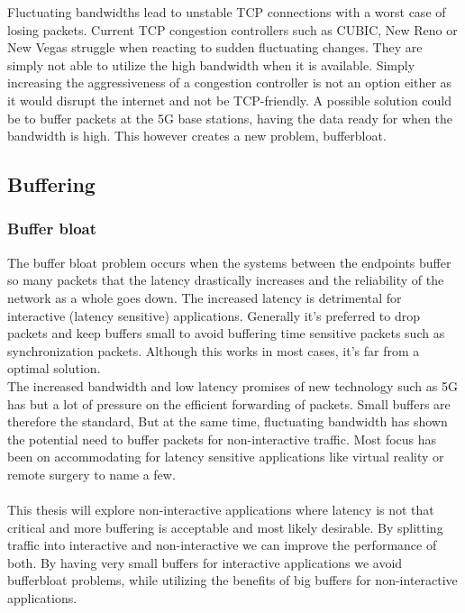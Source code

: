 \documentclass[a4paper,english, 11pt]{report}
\begin{document}
Fluctuating bandwidths lead to unstable TCP connections with a worst case of losing packets. Current TCP congestion controllers such as CUBIC, New Reno or New Vegas struggle when reacting to sudden fluctuating changes. They are simply not able to utilize the high bandwidth when it is available. Simply increasing the aggressiveness of a congestion controller is not an option either as it would disrupt the internet and not be TCP-friendly. A possible solution could be to buffer packets at the 5G base stations, having the data ready for when the bandwidth is high. This however creates a new problem, bufferbloat.


\subsection{Buffering}
\subsubsection{Buffer bloat}
The buffer bloat problem occurs when the systems between the endpoints buffer so many packets that the latency drastically increases and the reliability of the network as a whole goes down. The increased latency is detrimental for interactive (latency sensitive) applications. Generally it's preferred to drop packets and keep buffers small to avoid buffering time sensitive packets such as synchronization packets. Although this works in most cases, it's far from a optimal solution.\\

The increased bandwidth and low latency promises of new technology such as 5G has but a lot of pressure on the efficient forwarding of packets. Small buffers are therefore the standard, But at the same time, fluctuating bandwidth has shown the potential need to buffer packets for non-interactive traffic.
Most focus has been on accommodating for latency sensitive applications like virtual reality or remote surgery to name a few.\\\\
This thesis will explore non-interactive applications where latency is not that critical and more buffering is acceptable and most likely desirable. By splitting traffic into interactive and non-interactive we can improve the performance of both. By having very small buffers for interactive applications we avoid bufferbloat problems, while utilizing the benefits of big buffers for non-interactive applications.\\
\end{document}
